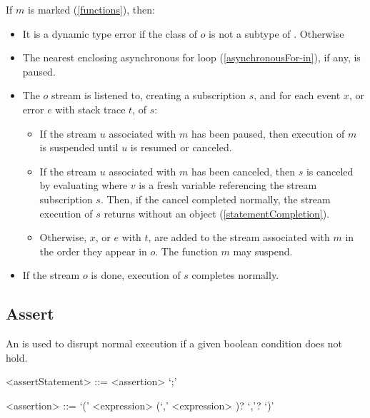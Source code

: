 \documentclass[makeidx]{article}
\begin{document}
{\LMHash{}%
If $m$ is marked \code{\ASYNC*} (\ref{functions}), then:
\begin{itemize}
\item
  It is a dynamic type error if the class of $o$
  is not a subtype of .
Otherwise
\item
  The nearest enclosing asynchronous for loop (\ref{asynchronousFor-in}),
  if any, is paused.
\item
  The $o$ stream is listened to, creating a subscription $s$,
  and for each event $x$, or error $e$ with stack trace $t$, of $s$:
  \begin{itemize}
  \item
    If the stream $u$ associated with $m$ has been paused,
    then execution of $m$ is suspended until $u$ is resumed or canceled.
  \item
    If the stream $u$ associated with $m$ has been canceled,
    then $s$ is canceled by evaluating 
    where $v$ is a fresh variable referencing the stream subscription $s$.
    Then, if the cancel completed normally,
    the stream execution of $s$ returns without an object
    (\ref{statementCompletion}).
  \item
    Otherwise, $x$, or $e$ with $t$, are added to
    the stream associated with $m$ in the order they appear in $o$.
    The function $m$ may suspend.
  \end{itemize}
\item
  If the stream $o$ is done, execution of $s$ completes normally.
\end{itemize}


\subsection{Assert}

\LMHash{}%
An  is used to disrupt normal execution if a given boolean condition does not hold.

\begin{grammar}
<assertStatement> ::= <assertion> `;'

<assertion> ::= \ASSERT{} `(' <expression> (`,' <expression> )? `,'? `)'
\end{grammar}

}
\end{document}
